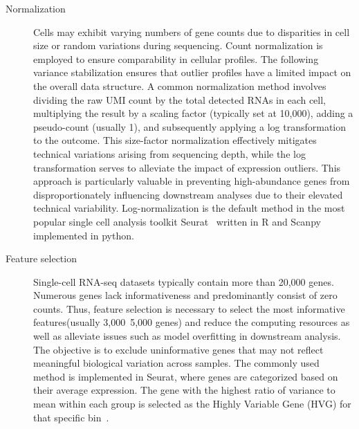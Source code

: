 \begin{description}
	\item[Normalization]
	Cells may exhibit varying numbers of gene counts due to disparities in cell size or random variations during sequencing. Count normalization is employed to ensure comparability in cellular profiles. The following variance stabilization ensures that outlier profiles have a limited impact on the overall data structure. A common normalization method involves dividing the raw UMI count by the total detected RNAs in each cell, multiplying the result by a scaling factor (typically set at 10,000), adding a pseudo-count (usually 1), and subsequently applying a log transformation to the outcome. This size-factor normalization effectively mitigates technical variations arising from sequencing depth, while the log transformation serves to alleviate the impact of expression outliers. This approach is particularly valuable in preventing high-abundance genes from disproportionately influencing downstream analyses due to their elevated technical variability. Log-normalization is the default method in the most popular single cell analysis toolkit Seurat~\citep{stuart2019seurat3} written in R and Scanpy~\citep{wolf2018scanpy} implemented in python. 

	\item[Feature selection]
	Single-cell RNA-seq datasets typically contain more than 20,000 genes. Numerous genes lack informativeness and predominantly consist of zero counts. Thus, feature selection is necessary to select the most informative features(usually 3,000~5,000 genes) and reduce the computing resources as well as alleviate issues such as model overfitting in downstream analysis\citep{yang2021feature}. The objective is to exclude uninformative genes that may not reflect meaningful biological variation across samples. The commonly used method is implemented in Seurat, where genes are categorized based on their average expression. The gene with the highest ratio of variance to mean within each group is selected as the Highly Variable Gene (HVG) for that specific bin~\citep{stuart2019seurat3}.
\end{description}

